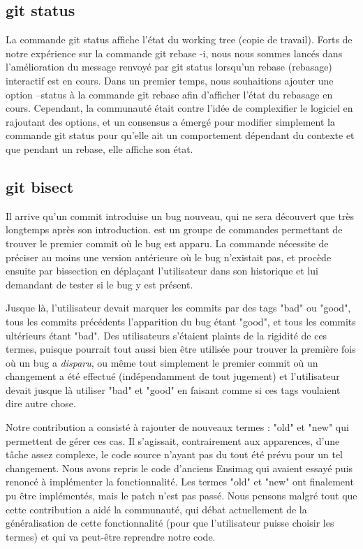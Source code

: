 \documentclass[a4paper, 12pt]{article}
\begin{document}
\subsection{git status}

La commande git status affiche l'état du working tree (copie de travail).
Forts de notre expérience sur la commande git rebase -i, nous nous sommes lancés dans l'amélioration du message renvoyé par git status lorsqu'un rebase (rebasage) interactif est en cours.
Dans un premier temps, nous souhaitions ajouter une option --status à la commande git rebase afin d'afficher l'état du rebasage en cours. 
Cependant, la communauté était contre l'idée de complexifier le logiciel en rajoutant des options, et un consensus a émergé pour modifier simplement la commande git status pour qu'elle ait un comportement dépendant du contexte et que pendant un rebase, elle affiche son état.




\subsection{git bisect}

Il arrive qu'un commit introduise un bug nouveau, qui ne sera découvert que très longtemps après son introduction.  est un groupe de commandes permettant de trouver le premier commit où le bug est apparu. La commande nécessite de préciser au moins une version antérieure où le bug n'existait pas, et procède ensuite par bissection en déplaçant l'utilisateur dans son historique et lui demandant de tester si le bug y est présent.

Jusque là, l'utilisateur devait marquer les commits par des tags "bad" ou "good", tous les commits précédents l'apparition du bug étant "good", et tous les commits ultérieurs étant "bad". Des utilisateurs s'étaient plaints de la rigidité de ces termes, puisque  pourrait tout aussi bien être utilisée pour trouver la première fois où un bug a \emph{disparu}, ou même tout simplement le premier commit où un changement a été effectué (indépendamment de tout jugement) et l'utilisateur devait jusque là utiliser "bad" et "good" en faisant comme si ces tags voulaient dire autre chose.

Notre contribution a consisté à rajouter de nouveaux termes : "old" et "new" qui permettent de gérer ces cas. Il s'agissait, contrairement aux apparences, d'une tâche assez complexe, le code source n'ayant pas du tout été prévu pour un tel changement. Nous avons repris le code d'anciens Ensimag qui avaient essayé puis renoncé à implémenter la fonctionnalité. Les termes "old" et "new" ont finalement pu être implémentés, mais le patch n'est pas passé. Nous pensons malgré tout que cette contribution a aidé la communauté, qui débat actuellement de la généralisation de cette fonctionnalité (pour que l'utilisateur puisse choisir les termes) et qui va peut-être reprendre notre code.
\end{document}

